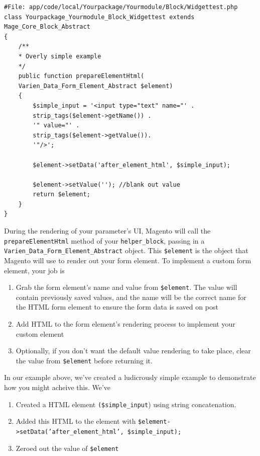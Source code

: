 \documentclass[oneside]{book}
\begin{document}
\begin{lstlisting}
#File: app/code/local/Yourpackage/Yourmodule/Block/Widgettest.php
class Yourpackage_Yourmodule_Block_Widgettest extends Mage_Core_Block_Abstract
{
    /**
    * Overly simple example
    */
    public function prepareElementHtml(
    Varien_Data_Form_Element_Abstract $element)
    {
        $simple_input = '<input type="text" name="' .
        strip_tags($element->getName()) .
        '" value="' .
        strip_tags($element->getValue()).
        '"/>';

        $element->setData('after_element_html', $simple_input);

        $element->setValue(''); //blank out value
        return $element;
    }
}

\end{lstlisting}


During the rendering of your parameter's UI, Magento will call the  \footnotesize\texttt{prepareElementHtml} \normalsize  method of your \footnotesize\texttt{helper\_block}\normalsize, passing in a \footnotesize\texttt{Varien\_Data\_Form\_Element\_Abstract} \normalsize  object.  This \footnotesize\texttt{\$element} \normalsize  is the object that Magento will use to render out your form element.  To implement a custom form element, your job is

\begin{enumerate}
\item Grab the form element's name and value from \footnotesize\texttt{\$element}\normalsize. The value will contain previously saved values, and the name will be the correct name for the HTML form element to ensure the form data is saved on post
\item Add HTML to the form element's rendering process to implement your custom element
\item Optionally, if you don't want the default value rendering to take place, clear the value from \footnotesize\texttt{\$element} \normalsize  before returning it.
\end{enumerate}


In our example above, we've created a ludicrously simple example to demonstrate how you might acheive this. We've

\begin{enumerate}
\item Created a HTML element \footnotesize\texttt{(\$simple\_input}\normalsize) using string concatenation.
\item Added this HTML to the element with \footnotesize\texttt{\$element-\textgreater setData('after\_element\_html', \$simple\_input);} \normalsize
\item Zeroed out the value of \footnotesize\texttt{\$element} \normalsize
\end{enumerate}
\end{document}
